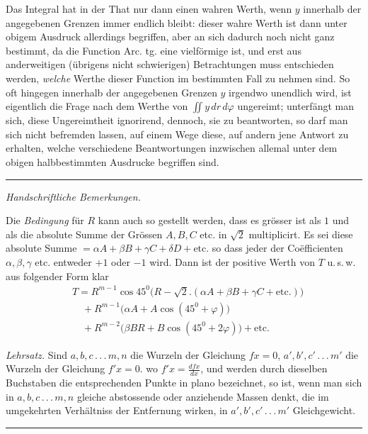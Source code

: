 Das Integral hat in der That nur dann einen wahren Werth, wenn $y$
innerhalb der angegebenen Grenzen immer endlich bleibt: dieser wahre
Werth ist dann unter obigem Ausdruck allerdings begriffen, aber an sich
dadurch noch nicht ganz bestimmt, da die Function Arc. tg. eine
vielförmige ist, und erst aus anderweitigen (übrigens nicht schwierigen)
Betrachtungen muss entschieden werden, \emph{welche}
Werthe dieser Function im bestimmten Fall zu nehmen sind.
So oft hingegen innerhalb der angegebenen Grenzen $y$ irgendwo unendlich
wird, ist eigentlich die Frage nach dem Werthe von $\iint y\,dr\,d\varphi$
ungereimt; unterfängt man sich, diese Ungereimtheit ignorirend, dennoch,
sie zu beantworten, so darf man sich nicht befremden lassen, auf einem
Wege diese, auf andern jene Antwort zu erhalten, welche verschiedene
Beantwortungen inzwischen allemal unter dem obigen halbbestimmten
Ausdrucke begriffen sind.

\par\medskip\noindent\rule{0.25\linewidth}{0.4pt}\par\smallskip
\begingroup\small
\emph{Handschriftliche Bemerkungen.}

Die \emph{Bedingung} für $R$ kann auch so gestellt werden, dass es
grösser ist als $1$ und als die absolute Summe der Grössen $A,B,C$ etc.
in $\surd2$ multiplicirt. Es sei diese absolute Summe
$=\alpha A+\beta B+\gamma C+\delta D+\mathrm{etc.}$ so dass jeder der
Coëfficienten $\alpha,\beta,\gamma$ etc. entweder $+1$ oder $-1$ wird.
Dann ist der positive Werth von $T$ u.\,s.\,w. aus folgender Form klar
\[
\begin{aligned}&T=R^{m-1}\cos45^0\bigl(R-\surd2.(\alpha A+\beta B+\gamma C+\mathrm{etc.})\bigr)\\
&\quad+R^{m-1}\bigl(\alpha A+A\cos(45^0+\varphi)\bigr)\\
&\quad+R^{m-2}\bigl(\beta BR+B\cos(45^0+2\varphi)\bigr)+\mathrm{etc.}
\end{aligned}
\]

\emph{Lehrsatz.} Sind $a,b,c\,.\,.\,.\,m,n$ die Wurzeln der Gleichung
$fx=0$, $a',b',c'\,.\,.\,.\,m'$ die Wurzeln der Gleichung $f'x=0$.
wo $f'x=\frac{dfx}{dx}$, und werden durch dieselben Buchstaben die
entsprechenden Punkte in plano bezeichnet, so ist, wenn man sich in
$a,b,c\,.\,.\,.\,m,n$ gleiche abstossende oder anziehende Massen denkt,
die im umgekehrten Verhältniss der Entfernung wirken, in
$a',b',c'\,.\,.\,.\,m'$ Gleichgewicht.
\endgroup

\par\medskip\begin{center}\rule{0.25\linewidth}{0.4pt}\end{center}
